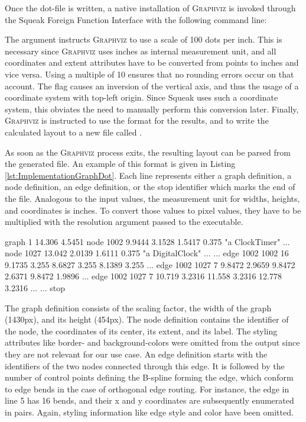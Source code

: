 Once the dot-file is written, a native installation of \textsc{Graphviz} is invoked through the Squeak Foreign Function Interface with the following command line:
\begin{center}
\end{center}
The  argument instructs \textsc{Graphviz} to use a scale of 100 dots per inch.
This is necessary since \textsc{Graphviz} uses inches as internal measurement unit, and all coordinates and extent attributes have to be converted from points to inches and vice versa.
Using a multiple of 10 ensures that no rounding errors occur on that account.
The  flag causes an inversion of the vertical axis, and thus the usage of a coordinate system with top-left origin.
Since Squeak uses such a coordinate system, this obviates the need to manually perform this conversion later.
Finally, \textsc{Graphviz} is instructed to use the  format for the results, and to write the calculated layout to a new file called .

As soon as the \textsc{Graphviz} process exits, the resulting layout can be parsed from the generated file.
An example of this  format is given in Listing \ref{lst:ImplementationGraphDot}.
Each line represents either a graph definition, a node definition, an edge definition, or the stop identifier which marks the end of the file.
Analogous to the input values, the measurement unit for widths, heights, and coordinates is inches.
To convert those values to pixel values, they have to be multiplied with the resolution argument passed to the  executable.

\begin{graphviz}[caption={Output in plain-ext format as produced by \textsc{Graphviz} for the input from Listing \ref{lst:ImplementationGraphDot}}, label=lst:ImplementationGraphPlainExt]
graph 1 14.306 4.5451
node 1002 9.9444 3.1528 1.5417 0.375 "a ClockTimer" ...
node 1027 13.042 2.0139 1.6111 0.375 "a DigitalClock" ...
...
edge 1002 1002 16 9.1735 3.255 8.6827 3.255 8.1389 3.255 ...
edge 1002 1027 7 9.8472 2.9659 9.8472 2.6371 9.8472 1.9896 ...
edge 1002 1027 7 10.719 3.2316 11.558 3.2316 12.778 3.2316 ...
...
stop
\end{graphviz}

The graph definition consists of the scaling factor, the width of the graph (1430px), and its height (454px).
The node definition contains the identifier of the node, the coordinates of its center, its extent, and its label.
The styling attributes like border- and background-colors were omitted from the output since they are not relevant for our use case.
An edge definition starts with the identifiers of the two nodes connected through this edge.
It is followed by the number of control points defining the B-spline forming the edge, which conform to edge bends in the case of orthogonal edge routing.
For instance, the edge in line 5 has 16 bends, and their x and y coordinates are subsequently enumerated in pairs.
Again, styling information like edge style and color have been omitted.


